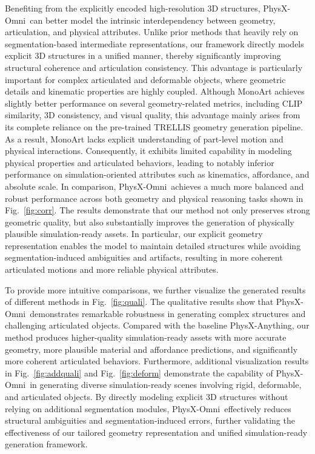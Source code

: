 \documentclass[11pt]{article}
\def\ourname{PhysX-Omni}
\begin{document}
Benefiting from the explicitly encoded high-resolution 3D structures, \ourname\ can better model the intrinsic interdependency between geometry, articulation, and physical attributes. Unlike prior methods that heavily rely on segmentation-based intermediate representations, our framework directly models explicit 3D structures in a unified manner, thereby significantly improving structural coherence and articulation consistency. This advantage is particularly important for complex articulated and deformable objects, where geometric details and kinematic properties are highly coupled. Although MonoArt achieves slightly better performance on several geometry-related metrics, including CLIP similarity, 3D consistency, and visual quality, this advantage mainly arises from its complete reliance on the pre-trained TRELLIS geometry generation pipeline. As a result, MonoArt lacks explicit understanding of part-level motion and physical interactions. Consequently, it exhibits limited capability in modeling physical properties and articulated behaviors, leading to notably inferior performance on simulation-oriented attributes such as kinematics, affordance, and absolute scale. In comparison, \ourname\ achieves a much more balanced and robust performance across both geometry and physical reasoning tasks shown in Fig.~\ref{fig:corr}. The results demonstrate that our method not only preserves strong geometric quality, but also substantially improves the generation of physically plausible simulation-ready assets. In particular, our explicit geometry representation enables the model to maintain detailed structures while avoiding segmentation-induced ambiguities and artifacts, resulting in more coherent articulated motions and more reliable physical attributes.

To provide more intuitive comparisons, we further visualize the generated results of different methods in Fig.~\ref{fig:quali}. The qualitative results show that \ourname\ demonstrates remarkable robustness in generating complex structures and challenging articulated objects. Compared with the baseline PhysX-Anything, our method produces higher-quality simulation-ready assets with more accurate geometry, more plausible material and affordance predictions, and significantly more coherent articulated behaviors. Furthermore, additional visualization results in Fig.~\ref{fig:addquali} and Fig.~\ref{fig:deform} demonstrate the capability of \ourname\ in generating diverse simulation-ready scenes involving rigid, deformable, and articulated objects. By directly modeling explicit 3D structures without relying on additional segmentation modules, \ourname\ effectively reduces structural ambiguities and segmentation-induced errors, further validating the effectiveness of our tailored geometry representation and unified simulation-ready generation framework.
\end{document}
